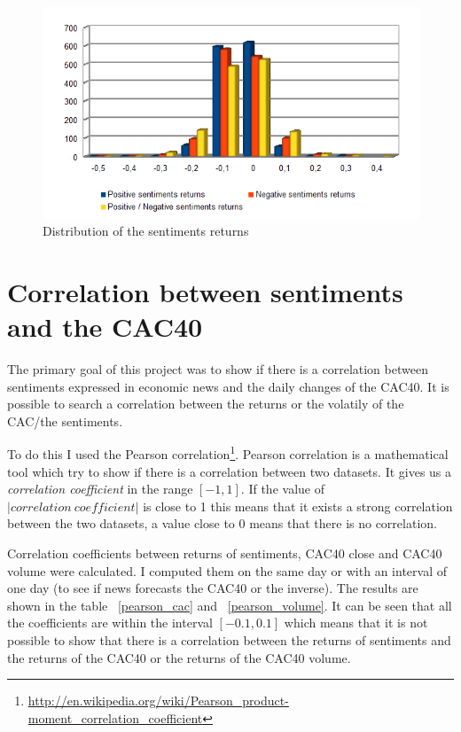 \documentclass[12pt]{report}
\begin{document}
\begin{figure}[H]
	\caption{Distribution of the sentiments returns\label{dist_sentiments}}
	\includegraphics{plots/dists/pos_neg_posneg_returns_dist.png}
\end{figure}

\section{Correlation between sentiments and the CAC40}

The primary goal of this project was to show if there is a correlation between sentiments expressed in economic news and the daily changes of the CAC40. It is possible to search a correlation between the returns or the volatily of the CAC/the sentiments.

To do this I used the Pearson correlation\footnote{\url{http://en.wikipedia.org/wiki/Pearson_product-moment_correlation_coefficient}}. Pearson correlation is a mathematical tool which try to show if there is a correlation between two datasets. It gives us a \emph{correlation coefficient} in the range $[-1, 1]$. If the value of $|correlation\ coefficient|$ is close to 1 this means that it exists a strong correlation between the two datasets, a value close to 0 means that there is no correlation.

Correlation coefficients between returns of sentiments, CAC40 close and CAC40 volume were calculated. I computed them on the same day or with an interval of one day (to see if news forecasts the CAC40 or the inverse). The results are shown in the table ~\ref{pearson_cac} and ~\ref{pearson_volume}. It can be seen that all the coefficients are within the interval $[-0.1, 0.1]$ which means that it is not possible to show that there is a correlation between the returns of sentiments and the returns of the CAC40 or the returns of the CAC40 volume.
\end{document}
